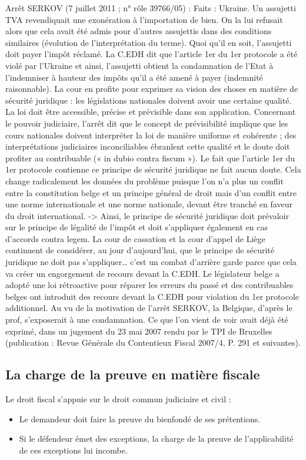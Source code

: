 \documentclass{book}
\begin{document}
    
Arrêt SERKOV (7 juillet 2011 ; n° rôle 39766/05) : 
Faits : Ukraine. Un assujetti TVA revendiquait une exonération à l’importation de bien. On la lui refusait alors que cela avait été admis pour d’autres assujettis dans des conditions similaires (évolution de l’interprétation du terme). Quoi qu’il en soit, l’assujetti doit payer l’impôt réclamé. La C.EDH dit que l’article 1er du 1er protocole a été violé par l’Ukraine et ainsi, l’assujetti obtient la condamnation de l’Etat à l’indemniser à hauteur des impôts qu’il a été amené à payer (indemnité raisonnable). 
La cour en profite pour exprimer sa vision des choses en matière de sécurité juridique : les législations nationales doivent avoir une certaine qualité. La loi doit être accessible, précise et prévisible dans son application. Concernant le pouvoir judiciaire, l’arrêt dit que le concept de prévisibilité implique que les cours nationales doivent interpréter la loi de manière uniforme et cohérente ; des interprétations judiciaires inconciliables ébranlent cette qualité et le doute doit profiter au contribuable (« in dubio contra fiscum »). 
Le fait que l’article 1er du 1er protocole contienne ce principe de sécurité juridique ne fait aucun doute. Cela change radicalement les données du problème puisque l’on n’a plus un conflit entre la constitution belge et un principe général de droit mais d’un conflit entre une norme internationale et une norme nationale, devant être tranché en faveur du droit international. 
-> Ainsi, le principe de sécurité juridique doit prévaloir sur le principe de légalité de l’impôt et doit s’appliquer également en cas d’accords contra legem. 
La cour de cassation et la cour d’appel de Liège continuent de considérer, au jour d’aujourd’hui, que le principe de sécurité juridique ne doit pas s’appliquer… c’est un combat d’arrière garde parce que cela va créer un engorgement de recours devant la C.EDH. 
Le législateur belge a adopté une loi rétroactive pour réparer les erreurs du passé et des contribuables belges ont introduit des recours devant la C.EDH pour violation du 1er protocole additionnel. Au vu de la motivation de l’arrêt SERKOV, la Belgique, d’après le prof, s’exposerait à une condamnation. 
Ce que l’on vient de voir avait déjà été exprimé, dans un jugement du 23 mai 2007 rendu par le TPI de Bruxelles (publication : Revue Générale du Contentieux Fiscal 2007/4, P. 291 et suivantes).  

\subsection{La charge de la preuve en matière fiscale}
Le droit fiscal s’appuie sur le droit commun judiciaire et civil :
\begin{itemize}
\item Le demandeur doit faire la preuve du bienfondé de ses prétentions. 
\item Si le défendeur émet des exceptions, la charge de la preuve de l’applicabilité de ces exceptions lui incombe. 
\end{itemize} 
\end{document}
